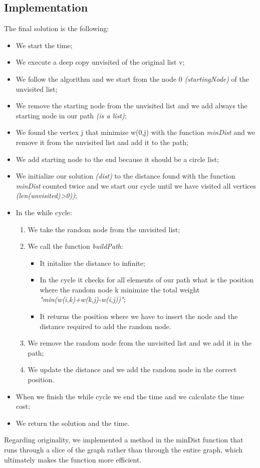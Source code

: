 \subsection{Implementation}
The final solution is the following:
\begin{itemize}
	\item We start the time;
	\item We execute a deep copy unvisited of the original list v;
	\item We follow the algorithm and we start from the node 0 \textit{(startingNode)} of the unvisited list;
	\item We remove the starting node from the unvisited list and we add always the starting node in our path \textit{(is a list)};
	\item We found the vertex j that minimize w(0,j) with the function \textit{minDist} and we remove it from the unvisited list and add it to the path;
	\item We add starting node to the end because it should be a circle list;
	\item We initialize our solution \textit{(dist)} to the distance found with the function \textit{minDist} counted twice and we start our cycle until we have visited all vertices \textit{(len(unvisited)>0))};
	\item In the while cycle:
	\begin{enumerate}
		\item We take the random node from the unvisited list;
		\item We call the function \textit{buildPath}:
		\begin{itemize}
			\item  It initalize the distance to infinite;
			\item  In the cycle it checks for all elements of our path what is the position where the random node k minimize the total weight \textit{"min(w(i,k)+w(k,j)-w(i,j))"};
			\item It returns the position where we have to insert the node and the distance required to add the random node.
		\end{itemize}
		\item We remove the random node from the unvisited list and we add it in the path;
		\item We update the distance and we add the random node in the correct position. 
	\end{enumerate}
	\item When we finish the while cycle we end the time and we calculate the time cost;
	\item We return the solution and the time.\\
\end{itemize}


Regarding originality, we implemented a method in the minDist function that runs through a slice of the graph rather than through the entire graph, which ultimately makes the function more efficient.




\pagebreak